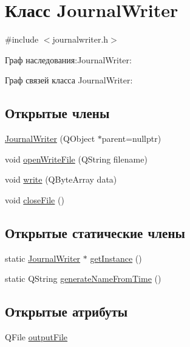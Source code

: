\hypertarget{class_journal_writer}{}\section{Класс Journal\+Writer}
\label{class_journal_writer}


{\ttfamily \#include $<$journalwriter.\+h$>$}



Граф наследования\+:Journal\+Writer\+:


Граф связей класса Journal\+Writer\+:
\subsection*{Открытые члены}
\begin{DoxyCompactItemize}
\item 
\hyperlink{class_journal_writer_ae35ea91e1a2e0b87fdb45826bfde47b6}{Journal\+Writer} (Q\+Object $\ast$parent=nullptr)
\item 
void \hyperlink{class_journal_writer_af4ffa24f865f9aaa383a3d361b24cc79}{open\+Write\+File} (Q\+String filename)
\item 
void \hyperlink{class_journal_writer_a635b3ca7a9ecc19b1827fa0e98bc09f6}{write} (Q\+Byte\+Array data)
\item 
void \hyperlink{class_journal_writer_a4bb7c0e4159408a23874c56573dc2446}{close\+File} ()
\end{DoxyCompactItemize}
\subsection*{Открытые статические члены}
\begin{DoxyCompactItemize}
\item 
static \hyperlink{class_journal_writer}{Journal\+Writer} $\ast$ \hyperlink{class_journal_writer_adc9e15e0d3114eba2658afc48c4c44a4}{get\+Instance} ()
\item 
static Q\+String \hyperlink{class_journal_writer_a1762840b51e6631c7a6be80631e16e0e}{generate\+Name\+From\+Time} ()
\end{DoxyCompactItemize}
\subsection*{Открытые атрибуты}
\begin{DoxyCompactItemize}
\item 
Q\+File \hyperlink{class_journal_writer_a4e2e6d2d0208bd4d168004cd9b403fd4}{output\+File}
\end{DoxyCompactItemize}
